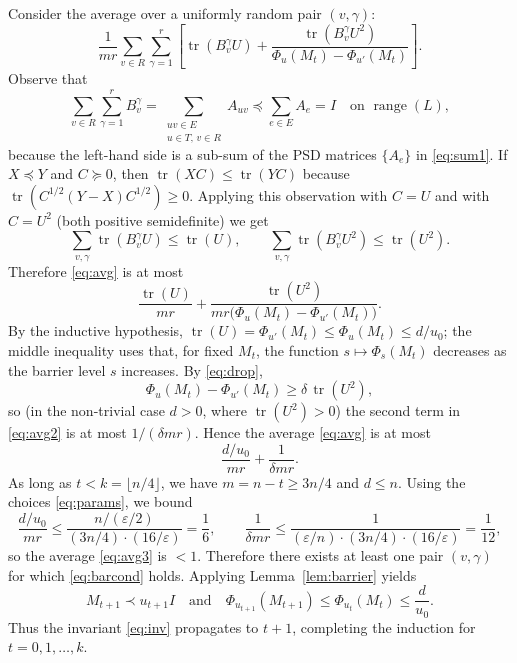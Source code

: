 \documentclass{article}
\begin{document}
Consider the average over a uniformly random pair $(v, \gamma)$:
\begin{equation}
  \frac{1}{mr} \sum_{v \in R} \sum_{\gamma=1}^r \left[
    \operatorname{tr}(B_v^\gamma U) + \frac{\operatorname{tr}(B_v^\gamma U^2)}{\Phi_u(M_t) - \Phi_{u'}(M_t)}
  \right]. \label{eq:avg}
\end{equation}
Observe that
\[
  \sum_{v \in R} \sum_{\gamma=1}^r B_v^\gamma
  = \sum_{\substack{uv \in E \\ u \in T,\, v \in R}} A_{uv} \preceq \sum_{e \in E} A_e = I
  \quad \text{on } \operatorname{range}(L),
\]
because the left-hand side is a sub-sum of the PSD matrices $\{A_e\}$ in \eqref{eq:sum1}. If
$X \preceq Y$ and $C \succeq 0$, then $\operatorname{tr}(XC) \le \operatorname{tr}(YC)$ because
$\operatorname{tr}(C^{1/2}(Y-X)C^{1/2}) \ge 0$. Applying this observation with $C = U$ and with $C = U^2$
(both positive semidefinite) we get
\[
  \sum_{v,\gamma} \operatorname{tr}(B_v^\gamma U) \le \operatorname{tr}(U), \qquad
  \sum_{v,\gamma} \operatorname{tr}(B_v^\gamma U^2) \le \operatorname{tr}(U^2).
\]
Therefore \eqref{eq:avg} is at most
\begin{equation}
  \frac{\operatorname{tr}(U)}{mr} + \frac{\operatorname{tr}(U^2)}{mr\bigl(\Phi_u(M_t) - \Phi_{u'}(M_t)\bigr)}. \label{eq:avg2}
\end{equation}
By the inductive hypothesis, $\operatorname{tr}(U) = \Phi_{u'}(M_t) \le \Phi_u(M_t) \le d/u_0$; the middle
inequality uses that, for fixed $M_t$, the function $s \mapsto \Phi_s(M_t)$ decreases as the
barrier level $s$ increases. By \eqref{eq:drop},
\[
  \Phi_u(M_t) - \Phi_{u'}(M_t) \ge \delta\, \operatorname{tr}(U^2),
\]
so (in the non-trivial case $d > 0$, where $\operatorname{tr}(U^2) > 0$) the second term in \eqref{eq:avg2}
is at most $1/(\delta m r)$. Hence the average \eqref{eq:avg} is at most
\begin{equation}
  \frac{d/u_0}{mr} + \frac{1}{\delta m r}. \label{eq:avg3}
\end{equation}
As long as $t < k = \lfloor n/4 \rfloor$, we have $m = n - t \ge 3n/4$ and $d \le n$. Using the
choices \eqref{eq:params}, we bound
\[
  \frac{d/u_0}{mr} \le \frac{n/(\varepsilon/2)}{(3n/4)\cdot(16/\varepsilon)} = \frac{1}{6}, \qquad
  \frac{1}{\delta m r} \le \frac{1}{(\varepsilon/n)\cdot(3n/4)\cdot(16/\varepsilon)} = \frac{1}{12},
\]
so the average \eqref{eq:avg3} is $< 1$. Therefore there exists at least one pair $(v, \gamma)$
for which \eqref{eq:barcond} holds. Applying Lemma~\ref{lem:barrier} yields
\[
  M_{t+1} \prec u_{t+1} I \quad \text{and} \quad \Phi_{u_{t+1}}(M_{t+1}) \le \Phi_{u_t}(M_t) \le \frac{d}{u_0}.
\]
Thus the invariant \eqref{eq:inv} propagates to $t+1$, completing the induction for
$t = 0, 1, \ldots, k$.
\end{document}
